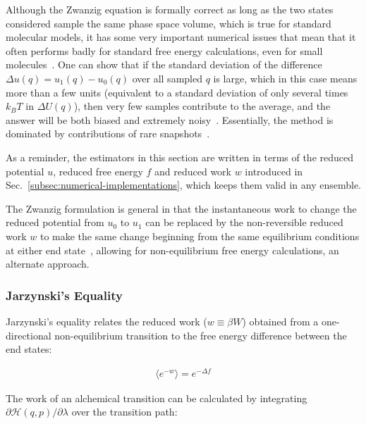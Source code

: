 Although the Zwanzig equation is formally correct as long as the two states considered sample the same phase space volume, which is true for standard molecular models, it has some very important numerical issues that mean that it often performs badly for standard free energy calculations, even for small molecules~\cite{shirts2005comparison,lu2003appropriate}. One can show that if the standard deviation of the difference $\Delta u(q) = u_1(q)-u_0(q)$ over all sampled $q$ is large, which in this case means more than a few units (equivalent to a standard deviation of only several times $k_BT$ in $\Delta U(q)$), then very few samples contribute to the average, and the answer will be both biased and extremely noisy~\cite{lelievre2010free}. Essentially, the method is dominated by contributions of rare snapshots~\cite{jarzynski2006rare, wu2005phasespace, wu2005phasespacea}. 

 As a reminder, the estimators in this section are written in terms of the reduced potential $u$, reduced free energy $f$ and reduced work $w$ introduced in Sec.~\ref{subsec:numerical-implementations}, which keeps them valid in any ensemble.
 
The Zwanzig formulation is general in that the instantaneous work to change the reduced potential from $u_0$ to $u_1$ can be replaced by the non-reversible reduced work $w$ to make the same change beginning from the same equilibrium conditions at either end state~\cite{jarzynski1997nonequilibrium,jarzynski1998equilibrium,crooks2000pathensemble}, allowing for non-equilibrium free energy calculations, an alternate approach. 

\subsubsection{Jarzynski's Equality}
Jarzynski's equality relates the reduced work ($w \equiv \beta W$) obtained from a one-directional non-equilibrium transition to the free energy difference between the end states:

\begin{eqnarray}\label{eqn.jarzynski}
\langle e^{-w} \rangle =e^{-\Delta f}
\end{eqnarray}

The work of an alchemical transition can be calculated by integrating $\partial \mathcal{H}(q,p)/\partial\lambda$ over the transition path:

